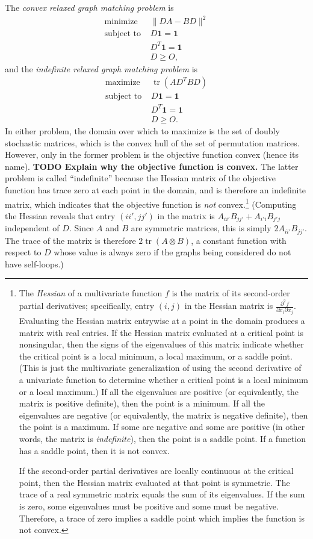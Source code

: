 \documentclass{article}
\newcommand{\todo}[1]{\textbf{TODO #1}}
\newcommand{\1}{\mathbf{1}}
\DeclareMathOperator{\tr}{tr}
\begin{document}
The \emph{convex relaxed graph matching problem} is
\begin{align*}
  \text{minimize } & \|DA - BD\|^2 \\
  \text{subject to } & D \1 = \1 \\
  & D^T \1 = \1 \\
  & D \geq O,
\end{align*}
and the \emph{indefinite relaxed graph matching problem} is
\begin{align*}
  \text{maximize } & \tr(AD^TBD) \\
  \text{subject to } & D \1 = \1 \\
  & D^T \1 = \1 \\
  & D \geq O.
\end{align*}
In either problem, the domain over which to maximize is the set of doubly stochastic matrices, which is the convex hull of the set of permutation matrices.
However, only in the former problem is the objective function convex (hence its name).
\todo{Explain why the objective function is convex.}
The latter problem is called ``indefinite'' because the Hessian matrix of the objective function has trace zero at each point in the domain, and is therefore an indefinite matrix, which indicates that the objective function is \emph{not} convex.\footnote{%
  The \emph{Hessian} of a multivariate function $f$ is the matrix of its second-order partial derivatives; specifically, entry $(i, j)$ in the Hessian matrix is $\frac{\partial^2 f}{\partial x_i \partial x_j}$.
  Evaluating the Hessian matrix entrywise at a point in the domain produces a matrix with real entries.
  If the Hessian matrix evaluated at a critical point is nonsingular, then the signs of the eigenvalues of this matrix indicate whether the critical point is a local minimum, a local maximum, or a saddle point.
  (This is just the multivariate generalization of using the second derivative of a univariate function to determine whether a critical point is a local minimum or a local maximum.)
  If all the eigenvalues are positive (or equivalently, the matrix is positive definite), then the point is a minimum.
  If all the eigenvalues are negative (or equivalently, the matrix is negative definite), then the point is a maximum.
  If some are negative and some are positive (in other words, the matrix is \emph{indefinite}), then the point is a saddle point.
  If a function has a saddle point, then it is not convex.

  If the second-order partial derivatives are locally continuous at the critical point, then the Hessian matrix evaluated at that point is symmetric.
  The trace of a real symmetric matrix equals the sum of its eigenvalues.
  If the sum is zero, some eigenvalues must be positive and some must be negative.
  Therefore, a trace of zero implies a saddle point which implies the function is not convex.%
}
(Computing the Hessian reveals that entry $(ii', jj')$ in the matrix is $A_{ii'} B_{jj'} + A_{i'i} B_{j'j}$ independent of $D$.
Since $A$ and $B$ are symmetric matrices, this is simply $2 A_{ii'} B_{jj'}$.
The trace of the matrix is therefore $2 \tr(A \otimes B)$, a constant function with respect to $D$ whose value is always zero if the graphs being considered do not have self-loops.)
\end{document}
